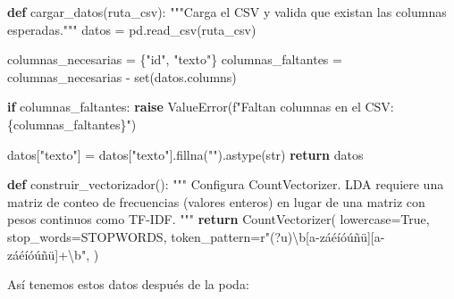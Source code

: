 \documentclass[
  spanish,
  letterpaper,
  DIV=11,
  numbers=noendperiod]{scrartcl}
\newenvironment{Shaded}{\begin{snugshade}}{\end{snugshade}}
\newcommand{\BuiltInTok}[1]{\textcolor[rgb]{0.00,0.23,0.31}{#1}}
\newcommand{\CommentTok}[1]{\textcolor[rgb]{0.37,0.37,0.37}{#1}}
\newcommand{\ControlFlowTok}[1]{\textcolor[rgb]{0.00,0.23,0.31}{\textbf{#1}}}
\newcommand{\DecValTok}[1]{\textcolor[rgb]{0.68,0.00,0.00}{#1}}
\newcommand{\FunctionTok}[1]{\textcolor[rgb]{0.28,0.35,0.67}{#1}}
\newcommand{\KeywordTok}[1]{\textcolor[rgb]{0.00,0.23,0.31}{\textbf{#1}}}
\newcommand{\NormalTok}[1]{\textcolor[rgb]{0.00,0.23,0.31}{#1}}
\newcommand{\OperatorTok}[1]{\textcolor[rgb]{0.37,0.37,0.37}{#1}}
\newcommand{\PreprocessorTok}[1]{\textcolor[rgb]{0.68,0.00,0.00}{#1}}
\newcommand{\SpecialCharTok}[1]{\textcolor[rgb]{0.37,0.37,0.37}{#1}}
\newcommand{\SpecialStringTok}[1]{\textcolor[rgb]{0.13,0.47,0.30}{#1}}
\newcommand{\StringTok}[1]{\textcolor[rgb]{0.13,0.47,0.30}{#1}}
\newcommand{\VariableTok}[1]{\textcolor[rgb]{0.07,0.07,0.07}{#1}}
\newcommand{\VerbatimStringTok}[1]{\textcolor[rgb]{0.13,0.47,0.30}{#1}}
\begin{document}
\begin{Shaded}
\begin{Highlighting}[]
\KeywordTok{def}\NormalTok{ cargar\_datos(ruta\_csv):}
    \CommentTok{"""Carga el CSV y valida que existan las columnas esperadas."""}
\NormalTok{    datos }\OperatorTok{=}\NormalTok{ pd.read\_csv(ruta\_csv)}

\NormalTok{    columnas\_necesarias }\OperatorTok{=}\NormalTok{ \{}\StringTok{"id"}\NormalTok{, }\StringTok{"texto"}\NormalTok{\}}
\NormalTok{    columnas\_faltantes }\OperatorTok{=}\NormalTok{ columnas\_necesarias }\OperatorTok{{-}} \BuiltInTok{set}\NormalTok{(datos.columns)}

    \ControlFlowTok{if}\NormalTok{ columnas\_faltantes:}
        \ControlFlowTok{raise} \PreprocessorTok{ValueError}\NormalTok{(}\SpecialStringTok{f"Faltan columnas en el CSV: }\SpecialCharTok{\{}\NormalTok{columnas\_faltantes}\SpecialCharTok{\}}\SpecialStringTok{"}\NormalTok{)}

\NormalTok{    datos[}\StringTok{"texto"}\NormalTok{] }\OperatorTok{=}\NormalTok{ datos[}\StringTok{"texto"}\NormalTok{].fillna(}\StringTok{""}\NormalTok{).astype(}\BuiltInTok{str}\NormalTok{)}
    \ControlFlowTok{return}\NormalTok{ datos}


\KeywordTok{def}\NormalTok{ construir\_vectorizador():}
    \CommentTok{"""}
\CommentTok{    Configura CountVectorizer.}
\CommentTok{    }
\CommentTok{    LDA requiere una matriz de conteo de frecuencias (valores enteros)}
\CommentTok{    en lugar de una matriz con pesos continuos como TF{-}IDF.}
\CommentTok{    """}
    \ControlFlowTok{return}\NormalTok{ CountVectorizer(}
\NormalTok{        lowercase}\OperatorTok{=}\VariableTok{True}\NormalTok{,}
\NormalTok{        stop\_words}\OperatorTok{=}\NormalTok{STOPWORDS,}
\NormalTok{        token\_pattern}\OperatorTok{=}\VerbatimStringTok{r"}\FunctionTok{(?u)}\DecValTok{\textbackslash{}b}\PreprocessorTok{[a{-}záéíóúñü][a{-}záéíóúñü]}\OperatorTok{+}\DecValTok{\textbackslash{}b}\VerbatimStringTok{"}\NormalTok{,}
\NormalTok{    )}
\end{Highlighting}
\end{Shaded}

Así tenemos estos datos después de la poda:
\end{document}

